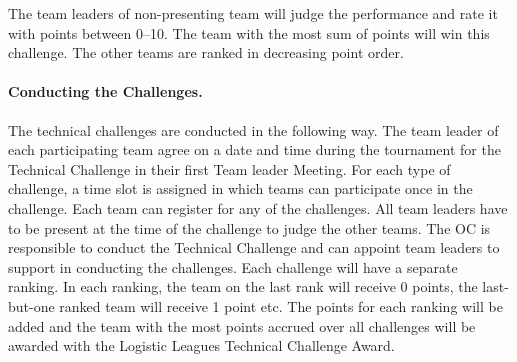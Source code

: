 \documentclass[12pt,twoside]{article}
\begin{document}
The team leaders of non-presenting team will judge the performance and
rate it with points between 0--10.  The team with the most sum of
points will win this challenge. The other teams are ranked in
decreasing point order.

\paragraph{Conducting the Challenges.~}
The technical challenges are conducted in the following way. The team
leader of each participating team agree on a date and time during the
tournament for the Technical Challenge in their first Team leader
Meeting. For each type of challenge, a time slot is assigned in which
teams can participate once in the challenge. Each team can register
for any of the challenges. All team leaders have to be present at the
time of the challenge to judge the other teams. The OC is responsible
to conduct the Technical Challenge and can appoint team leaders to
support in conducting the challenges. Each challenge will have a
separate ranking. In each ranking, the team on the last rank will
receive 0 points, the last-but-one ranked team will receive 1 point
etc. The points for each ranking will be added and the team with the
most points accrued over all challenges will be awarded with the
Logistic Leagues Technical Challenge Award.









\end{document}
